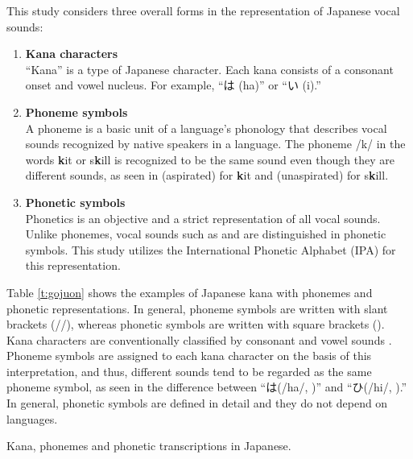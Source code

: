 \documentclass[english]{jnlp_1.4}
\begin{document}
This study considers three overall forms in the representation of Japanese vocal sounds:
\begin{enumerate}
  \item {\bf Kana characters}\\
        ``Kana'' is a type of Japanese character.
        Each kana consists of a consonant onset and vowel nucleus. For example, ``は (ha)'' or ``い (i).''
  \item {\bf Phoneme symbols}\\
        A phoneme is a basic unit of a language's phonology that describes vocal sounds recognized by native speakers in a language.
        The phoneme /k/ in the words {\bf k}it or s{\bf k}ill is recognized to be the same sound even though
        they are different sounds, as seen in \textipa{[k\super{h}]} (aspirated) for {\bf k}it and \textipa{[k]} (unaspirated) for s{\bf k}ill.
  \item {\bf Phonetic symbols}\\
        Phonetics is an objective and a strict representation of all vocal sounds.
        Unlike phonemes, vocal sounds such as \textipa{[k\super{h}]} and \textipa{[k]} are distinguished in phonetic symbols.
        This study utilizes the International Phonetic Alphabet (IPA) for this representation.
\end{enumerate}
Table \ref{t:gojuon} shows the examples of Japanese kana with phonemes and phonetic representations.
In general, phoneme symbols are written with slant brackets (//), whereas phonetic symbols are written with square brackets (\textipa{[\hspace{0.5mm}]}).
Kana characters are conventionally classified by consonant and vowel sounds \cite{roy1967}.
Phoneme symbols are assigned to each kana character on the basis of this interpretation, and thus,
different sounds tend to be regarded as the same phoneme symbol, as seen in the difference between ``は(/ha/, \textipa{[ha]})'' and ``ひ(/hi/, \textipa{[\c{c}i]}).''
In general, phonetic symbols are defined in detail and they do not depend on languages.

\begin{table}[b]
\caption{Kana, phonemes and phonetic transcriptions in Japanese.}
\label{t:gojuon}

\end{table}
\end{document}
